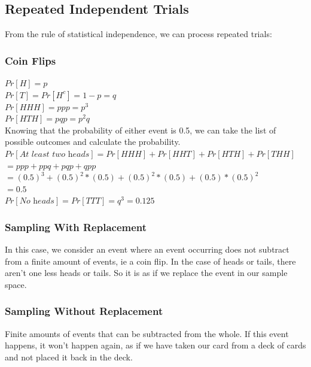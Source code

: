 \documentclass[11pt]{article}
\begin{document}
\subsection{Repeated Independent Trials}

From the rule of statistical independence, we can process repeated trials:
\subsubsection*{Coin Flips}
$Pr[H] = p$ \\

$Pr[T] = Pr[H^c] = 1 - p = q$ \\

$Pr[HHH] = ppp = p^3$ \\

$Pr[HTH] = pqp = p^2q$ \\


Knowing that the probability of either event is 0.5, we can take the list of possible outcomes and calculate the probability. \\


$Pr[\textit{At least two heads}] = Pr[HHH] + Pr[HHT] + Pr[HTH] + Pr[THH]$ \\ 

$ = ppp + ppq + pqp + qpp $ \\

$ = (0.5)^3 + (0.5)^2*(0.5) + (0.5)^2*(0.5) + (0.5)*(0.5)^2$ \\

$ = 0.5 $ \\

$Pr[\textit{No heads}] = Pr[TTT] = q^3 = 0.125$

\subsubsection{Sampling With Replacement}

In this case, we consider an event where an event occurring does not subtract from a finite amount of events, ie a coin flip. In the case of heads or tails, there aren't one less heads or tails. So it is as if we replace the event in our sample space.

\subsubsection{Sampling Without Replacement}

Finite amounts of events that can be subtracted from the whole. If this event happens, it won't happen again, as if we have taken our card from a deck of cards and not placed it back in the deck.
\end{document}
